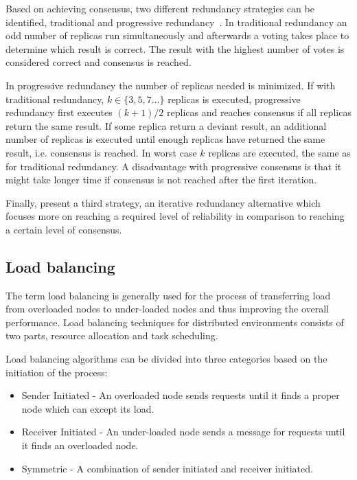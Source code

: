 \documentclass{cslthse-msc}
\begin{document}
Based on achieving consensus, two different redundancy strategies can be identified, traditional and progressive redundancy~\cite{selfAdaptRel}. In traditional redundancy an odd number of replicas run simultaneously and afterwards a voting takes place to determine which result is correct. The result with the highest number of votes is considered correct and consensus is reached.

In progressive redundancy the number of replicas needed is minimized. If with traditional redundancy, $k \in \{3,5,7...\}$ replicas is executed, progressive redundancy first executes $(k+1)/2$ replicas and reaches consensus if all replicas return the same result. If some replica return a deviant result, an additional number of replicas is executed until enough replicas have returned the same result, i.e. consensus is reached. In worst case $k$ replicas are executed, the same as for traditional redundancy. A disadvantage with progressive consensus is that it might take longer time if consensus is not reached after the first iteration.

Finally, \cite{selfAdaptRel} present a third strategy, an iterative redundancy alternative which focuses more on reaching a required level of reliability in comparison to reaching a certain level of consensus.


\subsection{Load balancing} \label{sec:background_load_balancing}
The term load balancing is generally used for the process of transferring load from overloaded nodes to under-loaded nodes and thus improving the overall performance. Load balancing techniques for distributed environments consists of two parts, resource allocation and task scheduling. 

Load balancing algorithms can be divided into three categories based on the initiation of the process:
\begin{itemize}
\item Sender Initiated - An overloaded node sends requests until it finds a proper node which can except its load.
\item Receiver Initiated - An under-loaded node sends a message for requests until it finds an overloaded node. %
\item Symmetric - A combination of sender initiated and receiver initiated. 
\end{itemize}
\end{document}
